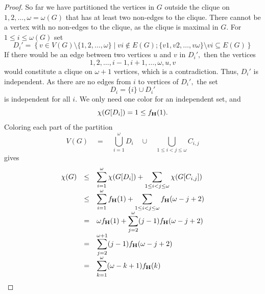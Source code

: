 \documentclass[10pt,a4paper]{amsart}
\begin{document}
\begin{proof}
So far we have partitioned the vertices in $G$ outside the clique on $1,2,\ldots, \omega=\omega(G)$  that has at least two non-edges to the clique. There cannot be a vertex with no non-edges to the clique, as the clique is maximal in $G.$ 
For $1\leq i \leq \omega(G)$ set
\[ D_i'
= \left\{ v\in V(G) \setminus \{1,2,\ldots, \omega\} \mid vi \not\in E(G); \{v1,v2, \ldots, v\omega \} \setminus vi \subseteq E(G) 
 \right \}
\]
If there would be an edge between two vertices $u$ and $v$ in $D_i',$ then the vertices
\[ 1,2, \ldots, i-1, i+1, \ldots, \omega, u, v \]
would constitute a clique on $\omega+1$ vertices, which is a contradiction. Thus, $D_i'$ is independent. As there are no edges from $i$ to vertices of $D_i',$ the set
\[ D_i = \{i\} \cup D_i' \]
is independent for all $i.$ We only need one color for an independent set, and
\[ \chi(G[D_i]) = 1 \leq  f_{{\bf H  } }( 1). \]
Coloring each part of the partition
\[ V(G) \quad = \quad   \bigcup_{i=1}^\omega D_{i}      \quad \cup \quad    \bigcup_{1\leq i < j \leq \omega}  C_{i,j}  \]
gives
\[\begin{array}{rcl} 
\chi(G) & \leq & \displaystyle  \sum_{i=1} ^\omega \chi(G[D_i]) +  \sum_{1\leq i < j \leq \omega}  \chi(G[C_{i,j}]) \\
& \leq & \displaystyle  \sum_{i=1} ^\omega  f_{{\bf H  } }( 1) +  \sum_{1\leq i < j \leq \omega}   f_{{\bf H  } }( \omega-j+2 ) \\
& = & \displaystyle  \omega  f_{{\bf H  } }( 1) +  \sum_{j=2}^\omega   (j-1)f_{{\bf H  } }( \omega-j+2 ) \\
& = & \displaystyle  \sum_{j=2}^{\omega+1}   (j-1)f_{{\bf H  } }( \omega-j+2 ) \\
& = & \displaystyle \sum_{k=1}^{\omega}  (\omega-k+1)  f_{{\bf H  } }(k)
\end{array}
\]
\end{proof}
\end{document}
